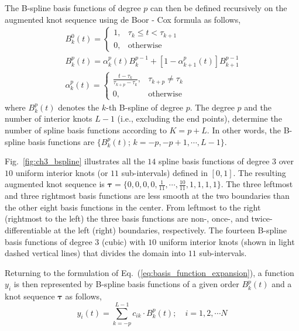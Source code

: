 The B-spline basis functions of degree $p$ can then be defined recursively on the augmented knot sequence using de Boor - Cox formula as follows, 
\begin{equation}
	\begin{split}
		B^0_k (t) = 
			\begin{cases}
				1, & \tau_k \leq t < \tau_{k+1} \\
			0, & \text{otherwise}
	\end{cases} \\
	B^p_k (t) =  \alpha^p_k (t) B^{p-1}_k + \left[1 - \alpha^p_{k+1} (t)\right] B^{p-1}_{k+1} \\
	\alpha^p_k (t) =
	\begin{cases}
				\frac{t - \tau_k}{\tau_{k+p}-\tau_k}, & \tau_{k+p} \neq \tau_k \\
			  0, & \text{otherwise}
	\end{cases}
	\end{split} 
\label{eq:deboor_cox}
\end{equation}
where $B_k^p (t)$ denotes the $k$-th B-spline of degree $p$.
The degree $p$ and the number of interior knots $L-1$ (i.e., excluding the end points), 
determine the number of spline basis functions according to $K = p + L$.
In other words, the B-spline basis functions are $\{B_k^p (t); \, k = -p,-p+1,\cdots,L-1\}$.

Fig.~\ref{fig:ch3_bspline} illustrates all the $14$ spline basis functions of degree $3$ over $10$ uniform interior knots (or $11$ sub-intervals) defined in $[0,1]$.
The resulting augmented knot sequence is $\boldsymbol{\tau}=\{0, 0, 0, 0, \frac{1}{11}, \cdots, \frac{10}{11}, 1, 1, 1, 1\}$.
The three leftmost and three rightmost basis functions are less smooth at the two boundaries than the other eight basis functions in the center. 
From leftmost to the right (rightmost to the left) the three basis functions are non-, once-, and twice-differentiable at the left (right) boundaries, respectively.
{The fourteen B-spline basis functions of degree $3$ (cubic) with $10$ uniform interior knots (shown in light dashed vertical lines) that divides the domain into $11$ sub-intervals.}

Returning to the formulation of Eq.~(\ref{eq:basis_function_expansion}),
a function $y_i$ is then represented by B-spline basis functions of a given order $B_k^p (t)$ and a knot sequence $\boldsymbol{\tau}$ as follows,
\begin{equation}
	y_i (t) = \sum_{k = -p}^{L-1} c_{ik} \cdot B^p_k (t); \quad i = 1, 2, \cdots N
\label{eq:basis_function_expansion}
\end{equation}

